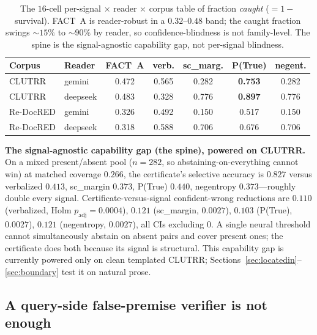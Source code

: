 \documentclass[11pt,letterpaper]{article}
\begin{document}
\begin{table}[t]
\centering
\small
\begin{tabular}{llccccc}
\hline
Corpus & Reader & FACT~A & verb. & sc\_marg. & P(True) & negent. \\
\hline
CLUTRR & gemini & 0.472 & 0.565 & 0.282 & \textbf{0.753} & 0.282 \\
CLUTRR & deepseek & 0.483 & 0.328 & 0.776 & \textbf{0.897} & 0.776 \\
Re-DocRED & gemini & 0.326 & 0.492 & 0.150 & 0.517 & 0.150 \\
Re-DocRED & deepseek & 0.318 & 0.588 & 0.706 & 0.676 & 0.706 \\
\hline
\end{tabular}
\caption{The $16$-cell per-signal $\times$ reader $\times$ corpus table of fraction \emph{caught} ($=1-$survival). FACT~A is reader-robust in a $0.32$--$0.48$ band; the caught fraction swings ${\sim}15\%$ to ${\sim}90\%$ by reader, so confidence-blindness is not family-level. The spine is the signal-agnostic capability gap, not per-signal blindness.}
\label{tab:caught}
\end{table}

\textbf{The signal-agnostic capability gap (the spine), powered on CLUTRR.} On a mixed present/absent pool ($n{=}282$, so abstaining-on-everything cannot win) at matched coverage $0.266$, the certificate's selective accuracy is $0.827$ versus verbalized $0.413$, sc\_margin $0.373$, P(True) $0.440$, negentropy $0.373$---roughly double every signal. Certificate-versus-signal confident-wrong reductions are $0.110$ (verbalized, Holm $p_{\text{adj}}{=}0.0004$), $0.121$ (sc\_margin, $0.0027$), $0.103$ (P(True), $0.0027$), $0.121$ (negentropy, $0.0027$), all CIs excluding $0$. A single neural threshold cannot simultaneously abstain on absent pairs and cover present ones; the certificate does both because its signal is structural. This capability gap is currently powered only on clean templated CLUTRR; Sections~\ref{sec:locatedin}--\ref{sec:boundary} test it on natural prose.

\subsection{A query-side false-premise verifier is not enough}
\label{sec:verifier}
\end{document}
